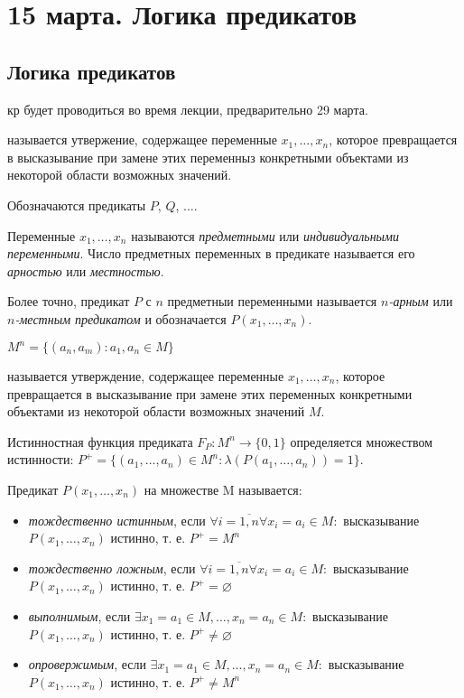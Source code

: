 \chapter{15 марта. Логика предикатов}
\section{Логика предикатов}
кр будет проводиться во время лекции, предварительно 29 марта.

 называется утвержение, содержащее переменные $x_1,\dots,x_n$, которое превращается в высказывание при замене этих переменныз конкретными объектами из некоторой области возможных значений.

Обозначаются предикаты $P$, $Q$, $\dots$.

Переменные $x_1,\dots,x_n$ называются {\it предметными} или {\it индивидуальными переменными}. Число предметных переменных в предикате называется его {\it арностью} или {\it местностью}.

Более точно, предикат $P$ с $n$ предметныи переменными называется {\it $n$-арным} или {\it $n$-местным предикатом} и обозначается $P(x_1,\dots,x_n)$.

$M^n = \{(a_n, a_m): a_1, a_n \in M \}$

 называется утверждение, содержащее переменные $x_1, \dots, x_n$, которое превращается в высказывание при замене этих переменных конкретными объектами из некоторой области возможных значений $M$.

Истинностная функция предиката $F_P: M^n \to \{0,1\}$ определяется множеством истинности: $P^+ = \{(a_1, \dots, a_n) \in M^n: \lambda(P(a_1, \dots, a_n)) = 1\}$.

\dftion Предикат $P(x_1, \dots, x_n)$ на множестве M называется:
\begin{itemize}
    \item {\it тождественно истинным}, если $\forall i=\overline{1,n} \forall x_i = a_i \in M:$ высказывание $P(x_1, \dots, x_n)$ истинно, т. е. $P^+ = M^n$
    \item {\it тождественно ложным}, если $\forall i=\overline{1,n} \forall x_i = a_i \in M:$ высказывание $P(x_1, \dots, x_n)$ истинно, т. е. $P^+ = \varnothing$
    \item {\it выполнимым}, если $\exists x_1 = a_1 \in M, \dots, x_n = a_n \in M:$ высказывание $P(x_1, \dots, x_n)$ истинно, т. е. $P^+ \neq \varnothing$
    \item {\it опровержимым}, если $\exists x_1 = a_1 \in M, \dots, x_n = a_n \in M:$ высказывание $P(x_1, \dots, x_n)$ истинно, т. е. $P^+ \neq M^n$
\end{itemize}

